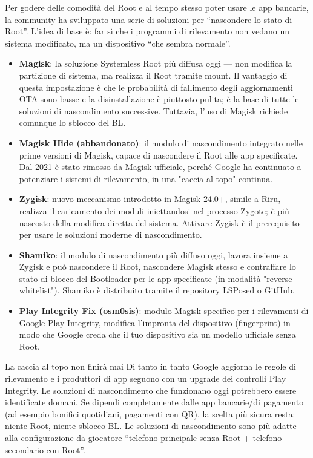 Per godere delle comodità del Root e al tempo stesso poter usare le app bancarie, la community ha sviluppato una serie di soluzioni per “nascondere lo stato di Root”. L'idea di base è: far sì che i programmi di rilevamento non vedano un sistema modificato, ma un dispositivo “che sembra normale”.

\begin{itemize}
  \item \textbf{Magisk}: la soluzione Systemless Root più diffusa oggi — non modifica la partizione di sistema, ma realizza il Root tramite mount. Il vantaggio di questa impostazione è che le probabilità di fallimento degli aggiornamenti OTA sono basse e la disinstallazione è piuttosto pulita; è la base di tutte le soluzioni di nascondimento successive. Tuttavia, l'uso di Magisk richiede comunque lo sblocco del BL.
  \item \textbf{Magisk Hide (abbandonato)}: il modulo di nascondimento integrato nelle prime versioni di Magisk, capace di nascondere il Root alle app specificate. Dal 2021 è stato rimosso da Magisk ufficiale, perché Google ha continuato a potenziare i sistemi di rilevamento, in una "caccia al topo" continua.
  \item \textbf{Zygisk}: nuovo meccanismo introdotto in Magisk 24.0+, simile a Riru, realizza il caricamento dei moduli iniettandosi nel processo Zygote; è più nascosto della modifica diretta del sistema. Attivare Zygisk è il prerequisito per usare le soluzioni moderne di nascondimento.
  \item \textbf{Shamiko}: il modulo di nascondimento più diffuso oggi, lavora insieme a Zygisk e può nascondere il Root, nascondere Magisk stesso e contraffare lo stato di blocco del Bootloader per le app specificate (in modalità "reverse whitelist"). Shamiko è distribuito tramite il repository LSPosed o GitHub.
  \item \textbf{Play Integrity Fix (osm0sis)}: modulo Magisk specifico per i rilevamenti di Google Play Integrity, modifica l'impronta del dispositivo (fingerprint) in modo che Google creda che il tuo dispositivo sia un modello ufficiale senza Root.
\end{itemize}

\begin{tcbwarn}{La caccia al topo non finirà mai}
Di tanto in tanto Google aggiorna le regole di rilevamento e i produttori di app seguono con un upgrade dei controlli Play Integrity. Le soluzioni di nascondimento che funzionano oggi potrebbero essere identificate domani. Se dipendi completamente dalle app bancarie/di pagamento (ad esempio bonifici quotidiani, pagamenti con QR), la scelta più sicura resta: niente Root, niente sblocco BL. Le soluzioni di nascondimento sono più adatte alla configurazione da giocatore “telefono principale senza Root + telefono secondario con Root”.

\end{tcbwarn}

